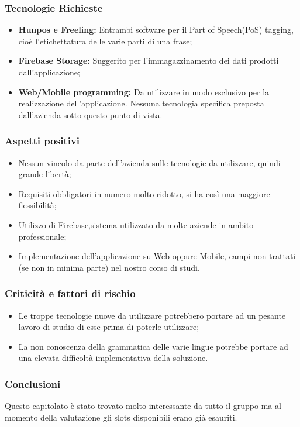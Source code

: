 \subsubsection{Tecnologie Richieste}
\begin{itemize}
	\item \textbf{Hunpos e Freeling: } Entrambi software per il Part of Speech(PoS) tagging, cioè l'etichettatura delle varie parti di una frase;
	\item \textbf{Firebase Storage: }Suggerito per l'immagazzinamento dei dati prodotti dall'applicazione;
	\item \textbf{Web/Mobile programming: }Da utilizzare in modo esclusivo per la realizzazione dell'applicazione. Nessuna tecnologia specifica preposta dall'azienda sotto questo punto di vista.
\end{itemize}
\subsubsection{Aspetti positivi}
\begin{itemize}
	\item Nessun vincolo da parte dell'azienda sulle tecnologie da utilizzare, quindi grande libertà;
	\item Requisiti obbligatori in numero molto ridotto, si ha così una maggiore flessibilità;
	\item Utilizzo di Firebase,sistema utilizzato da molte aziende in ambito professionale;
	\item Implementazione dell'applicazione su Web oppure Mobile, campi non trattati (se non in minima parte) nel nostro corso di studi. 
\end{itemize}
\subsubsection{Criticità e fattori di rischio}
\begin{itemize}
\item Le troppe tecnologie nuove da utilizzare potrebbero portare ad un pesante lavoro di studio di esse prima di poterle utilizzare;
\item La non conoscenza della grammatica delle varie lingue potrebbe portare ad una elevata difficoltà implementativa della soluzione.
\end{itemize}
\subsubsection{Conclusioni}
Questo capitolato è stato trovato molto interessante da tutto il gruppo ma al momento della valutazione gli slots disponibili erano già esauriti.
